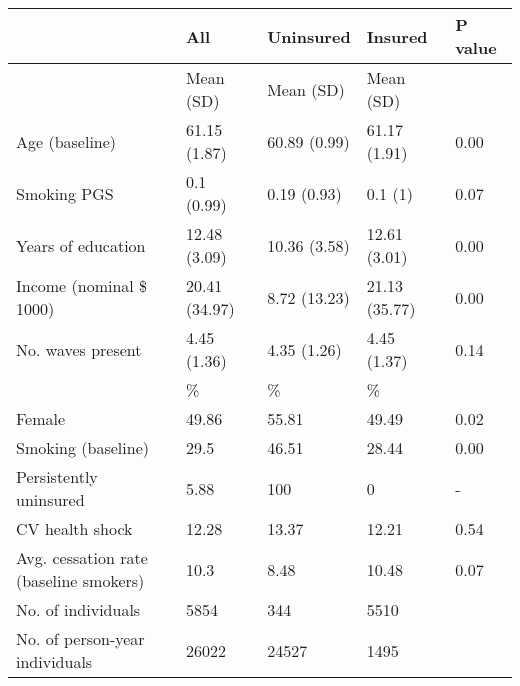 % 
\begin{tabular}{lllll}
  \toprule
\textbf{  } & \textbf{ All } & \textbf{ Uninsured } & \textbf{ Insured } & \textbf{ P value } \\ 
  \midrule
 & Mean (SD) & Mean (SD) & Mean (SD) &  \\ 
   \midrule
Age (baseline) & 61.15 (1.87) & 60.89 (0.99) & 61.17 (1.91) & 0.00 \\ 
  Smoking PGS & 0.1 (0.99) & 0.19 (0.93) & 0.1 (1) & 0.07 \\ 
  Years of education & 12.48 (3.09) & 10.36 (3.58) & 12.61 (3.01) & 0.00 \\ 
  Income (nominal \$ 1000) & 20.41 (34.97) & 8.72 (13.23) & 21.13 (35.77) & 0.00 \\ 
  No. waves present & 4.45 (1.36) & 4.35 (1.26) & 4.45 (1.37) & 0.14 \\ 
   & \% & \% & \% &  \\ 
  Female & 49.86 & 55.81 & 49.49 & 0.02 \\ 
  Smoking (baseline) & 29.5 & 46.51 & 28.44 & 0.00 \\ 
  Persistently uninsured & 5.88 & 100 & 0 & - \\ 
  CV health shock & 12.28 & 13.37 & 12.21 & 0.54 \\ 
  Avg. cessation rate (baseline smokers) & 10.3 & 8.48 & 10.48 & 0.07 \\ 
  No. of individuals & 5854 & 344 & 5510 &  \\ 
   \midrule
No. of person-year individuals & 26022 & 24527 & 1495 &  \\ 
  \end{tabular}
